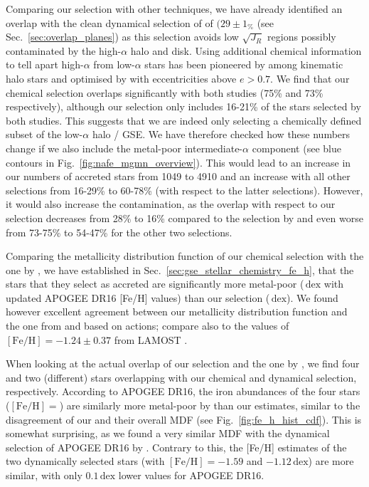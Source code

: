 \documentclass[fleqn,usenatbib]{mnras}
\newcommand{\added}[1]{#1}
\newcommand{\dex}{\,\mathrm{dex}}	%
\begin{document}
Comparing our selection with other techniques, we have already identified an overlap with the clean dynamical selection of \citet{Feuillet2021} of $(29\pm1_\%$ (see Sec.~\ref{sec:overlap_planes}) as this selection avoids low $\sqrt{J_R}$ regions possibly contaminated by the high-$\alpha$ halo and disk. Using additional chemical information to tell apart high-$\alpha$ from low-$\alpha$ stars has been pioneered by \citet{Nissen2010} among kinematic halo stars and optimised by \citet{Naidu2020} with eccentricities above $e > 0.7$. We find that our chemical selection overlaps significantly with both studies (75\% and 73\% respectively), although our selection only includes 16-21\% of the stars selected by both studies. This suggests that we are indeed only selecting a chemically defined subset of the low-$\alpha$ halo / GSE. We have therefore checked how these numbers change if we also include the metal-poor intermediate-$\alpha$ component (see blue contours in Fig.~\ref{fig:nafe_mgmn_overview}). This would lead to an increase in our numbers of accreted stars from 1049 to 4910 and an increase with all other selections from 16-29\% to 60-78\% (with respect to the latter selections). However, it would also increase the contamination, as the overlap with respect to our selection decreases from 28\% to 16\% compared to the selection by \citet{Feuillet2021} and even worse from 73-75\% to 54-47\% for the other two selections.

Comparing the metallicity distribution function of our chemical selection with the one by \citet{Das2020}, we have established in Sec.~\ref{sec:gse_stellar_chemistry_fe_h}, that the stars that they select as accreted are significantly more metal-poor ($\dex$ with updated APOGEE DR16 [Fe/H] values) than our selection ($\dex$). We found however excellent agreement between our metallicity distribution function and the one from \citet{Naidu2020} and \citet{Feuillet2020,Feuillet2021} based on actions\added{; compare also to the values of $\mathrm{[Fe/H]} = -1.24 \pm 0.37$ from LAMOST \citep{Amarante2020b}.}

When looking at the actual overlap of our selection and the one by \citet{Das2020}, we find four and two (different) stars overlapping with our chemical and dynamical selection, respectively. According to APOGEE DR16, the iron abundances of the four stars ($\mathrm{[Fe/H]} = $) are similarly more metal-poor by  than our estimates, similar to the disagreement of our and their overall MDF (see Fig.~\ref{fig:fe_h_hist_cdf}). This is somewhat surprising, as we found a very similar MDF with the dynamical selection of APOGEE DR16 by \citet{Feuillet2021}. Contrary to this, the [Fe/H] estimates of the two dynamically selected stars (with $\mathrm{[Fe/H]} = -1.59$ and $-1.12\dex$) are more similar, with only $0.1\dex$ lower values for APOGEE DR16.
\end{document}
